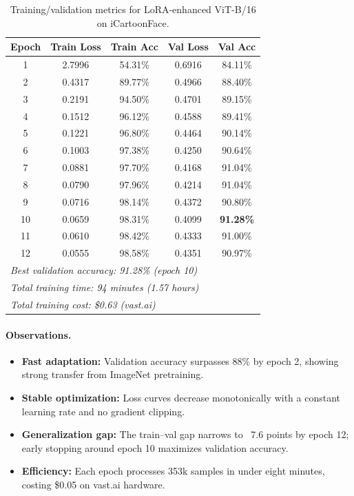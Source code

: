 \documentclass[11pt]{article}
\begin{document}
\begin{table}[H]
\centering
\small
\begin{tabular}{ccccc}
\toprule
\textbf{Epoch} & \textbf{Train Loss} & \textbf{Train Acc} & \textbf{Val Loss} & \textbf{Val Acc} \\
\midrule
1 & 2.7996 & 54.31\% & 0.6916 & 84.11\% \\
2 & 0.4317 & 89.77\% & 0.4966 & 88.40\% \\
3 & 0.2191 & 94.50\% & 0.4701 & 89.15\% \\
4 & 0.1512 & 96.12\% & 0.4588 & 89.41\% \\
5 & 0.1221 & 96.80\% & 0.4464 & 90.14\% \\
6 & 0.1003 & 97.38\% & 0.4250 & 90.64\% \\
7 & 0.0881 & 97.70\% & 0.4168 & 91.04\% \\
8 & 0.0790 & 97.96\% & 0.4214 & 91.04\% \\
9 & 0.0716 & 98.14\% & 0.4372 & 90.80\% \\
10 & 0.0659 & 98.31\% & 0.4099 & \textbf{91.28\%} \\
11 & 0.0610 & 98.42\% & 0.4333 & 91.00\% \\
12 & 0.0555 & 98.58\% & 0.4351 & 90.97\% \\
\midrule
\multicolumn{5}{l}{\textit{Best validation accuracy: 91.28\% (epoch 10)}} \\
\multicolumn{5}{l}{\textit{Total training time: 94 minutes (1.57 hours)}} \\
\multicolumn{5}{l}{\textit{Total training cost: \$0.63 (vast.ai)}} \\
\bottomrule
\end{tabular}
\caption{Training/validation metrics for LoRA-enhanced ViT-B/16 on iCartoonFace.}
\label{tab:training-progress}
\end{table}

\paragraph{Observations.}
\begin{itemize}
    \item \textbf{Fast adaptation:} Validation accuracy surpasses 88\% by epoch 2, showing strong transfer from ImageNet pretraining.
    \item \textbf{Stable optimization:} Loss curves decrease monotonically with a constant learning rate and no gradient clipping.
    \item \textbf{Generalization gap:} The train--val gap narrows to ~7.6 points by epoch 12; early stopping around epoch 10 maximizes validation accuracy.
    \item \textbf{Efficiency:} Each epoch processes 353k samples in under eight minutes, costing \$0.05 on vast.ai hardware.
\end{itemize}
\end{document}
